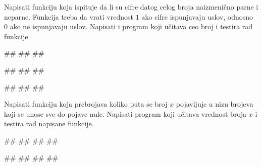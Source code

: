 \begin{Exercise}[label=p1.4_16] 
Napisati funkciju  koja ispituje da li su
cifre datog celog broja naizmenično parne i neparne. Funkcija treba da
vrati vrednost $1$ ako cifre ispunjavaju uslov, odnosno $0$ ako ne
ispunjavaju uslov. Napisati i program koji učitava ceo broj i testira
rad funkcije.
  
\begin{miditest}
\begin{upotreba}{1}
#\naslovInt#
##
##
\end{upotreba}
\end{miditest}
\begin{miditest}
\begin{upotreba}{2}
#\naslovInt#
##
##
\end{upotreba}
\end{miditest}

\begin{miditest}
\begin{upotreba}{3}
#\naslovInt#
##
##
\end{upotreba}
\end{miditest}

\end{Exercise}
\begin{Answer}[ref=p1.4_16]
\end{Answer}


\begin{Exercise}[label=p1.4_17] 
Napisati funkciju  koja prebrojava
koliko puta se broj $x$ pojavljuje u nizu brojeva koji se unose sve do
pojave nule. Napisati program koji učitava vrednost broja $x$ i
testira rad napisane funkcije.

\begin{miditest}
\begin{upotreba}{1}
#\naslovInt#
##
##
##
\end{upotreba}
\end{miditest}
\begin{miditest}
\begin{upotreba}{2}
#\naslovInt#
##
##
##
\end{upotreba}
\end{miditest}

\end{Exercise}
\begin{Answer}[ref=p1.4_17]
\end{Answer}


